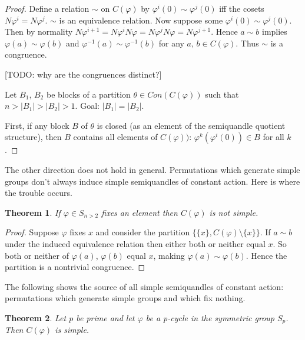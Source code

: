 \documentclass{amsart}
\newtheorem{thm}{Theorem}[section]
\theoremstyle{definition}
\numberwithin{equation}{section}
\begin{document}
\begin{proof}
Define a relation $\sim$ on $C(\varphi)$ by $\varphi^{i}(0) \sim \varphi^{j}(0)$ iff the cosets $N\varphi^{i} = N\varphi^{j}$. $\sim$ is an equivalence relation. Now suppose some $\varphi^{i}(0) \sim \varphi^{j}(0)$. Then by normality $N\varphi^{i+1} = N\varphi^{i}N\varphi = N\varphi^{j}N\varphi = N\varphi^{j+1}$. Hence $a \sim b$ implies $\varphi(a) \sim \varphi(b)$ and $\varphi^{-1}(a) \sim \varphi^{-1}(b)$ for any $a$, $b \in C(\varphi)$. Thus $\sim$ is a congruence.

[TODO: why are the congruences distinct?]

\bigskip

Let $B_1$, $B_2$ be blocks of a partition $\theta \in Con(C(\varphi))$ such that $n > \left|B_1\right| > \left|B_2\right| > 1$. Goal: $\left|B_1\right| = \left|B_2\right|$.

\bigskip

First, if any block $B$ of $\theta$ is closed (as an element of the semiquandle quotient structure), then $B$ contains all elements of $C(\varphi))$: $\varphi^k(\varphi^i(0)) \in B$ for all $k$.

\bigskip


\end{proof}

The other direction does not hold in general. Permutations which generate simple groups don't
always induce simple semiquandles of constant action. Here is where the trouble occurs.

\begin{thm}
If $\varphi \in S_{n > 2}$ fixes an element then $C(\varphi)$ is not simple.
\end{thm}

\begin{proof}
Suppose $\varphi$ fixes $x$ and consider the partition $\{ \{x\}, C(\varphi) \setminus \{x\} \}$.
If $a \sim b$ under the induced equivalence relation then either both or neither equal $x$.
So both or neither of $\varphi(a)$, $\varphi(b)$ equal $x$, making $\varphi(a) \sim \varphi(b)$.
Hence the partition is a nontrivial congruence.
\end{proof}

The following shows the source of all simple semiquandles of constant action: permutations
which generate simple groups and which fix nothing.

\begin{thm}
Let $p$ be prime and let $\varphi$ be a p-cycle in the symmetric group $S_p$.
Then $C(\varphi)$ is simple.
\end{thm}
\end{document}
